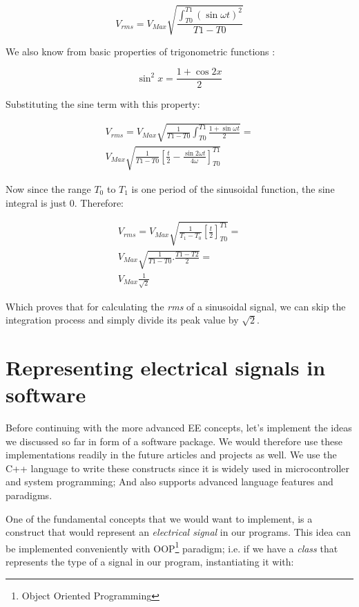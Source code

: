 \documentclass{article}
\begin{document}
	$$V_{rms} = V_{Max} \sqrt{\frac{\int_{T0}^{T1} (\sin \omega t) ^ 2}{T1 - T0}}$$
	
	We also know from basic properties of trigonometric functions :
	
	$$ \sin^2 x = \frac{1 + \cos 2x}{2} $$
	
	Substituting the sine term with this property:
	
	\begin{align} 
	V_{rms} = V_{Max} \sqrt{\frac{1}{{T1 - T0}}{\int_{T0}^{T1} \frac{1 + \sin \omega t}{2}}} = \\
	 V_{Max} \sqrt{\frac{1}{T1 - T0} \left[ \frac{t}{2} - \frac{\sin 2 \omega t}{4 \omega}\right]_{T0}^{T1} }
	\end{align}
	
	Now since the range $T_0$ to $T_1$ is one period of the sinusoidal function, the sine integral is just $0$. Therefore:
		
	\begin{equation}
	\begin{gathered}
	V_{rms} = V_{Max} \sqrt{\frac{1}{T_1 - T_0} \left[ \frac{t}{2} \right]_{T0}^{T1}} = \\
	V_{Max}\sqrt{\frac{1}{T1 - T0} . \frac{T1 - T2}{2}} = \\
 V_{Max} \frac{1}{\sqrt{2}}
	\end{gathered}
	\end{equation}

	Which proves that for calculating the \textit{rms} of a sinusoidal signal, we can skip the integration process and simply divide its peak value by $\sqrt{2}$.

	
	\section{Representing electrical signals in software}
	Before continuing with the more advanced EE concepts, let's implement the ideas we discussed so far in form of a software package. We would therefore use these implementations readily in the future articles and projects as well. We use the C++ language to write these constructs since it is widely used in microcontroller and system programming; And also supports advanced language features and paradigms.
	
	One of the fundamental concepts that we would want to implement, is a construct that would represent an \textit{electrical signal} in our programs. This idea can be implemented conveniently with OOP\footnote[1]{Object Oriented Programming} paradigm; i.e. if we have a \textit{class} that represents the type of a signal in our program, instantiating it with:
	
\end{document}
